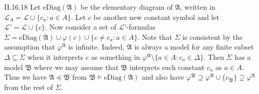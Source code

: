 \documentclass[12pt]{article}
\begin{document}
\begin{customthm}{II.16.18}
  Let $\mathrm{eDiag}(\mathfrak{A})$ be the elementary diagram of $\mathfrak{A}$, written in $\mathcal{L}_A=\mathcal{L}\cup\{c_a:a\in A\}$. Let $c$ be another new constant symbol and let $\mathcal{L}'=\mathcal{L}\cup\{c\}$. Now consider a set of $\mathcal{L}'$-formulas $\Sigma=\mathrm{eDiag}(\mathfrak{A})\cup{\varphi(c)}\cup\{c\neq c_a:a\in A\}$. Note that $\Sigma$ is consistent by the assumption that $\varphi^\mathfrak{A}$ is infinite. Indeed, $\mathfrak{A}$ is always a model for any finite subset $\Delta\subseteq\Sigma$ when it interprets $c$ as something in $\varphi^\mathfrak{A}\setminus\{a\in A: c_a\in\Delta\}$. Then $\Sigma$ has a model $\mathfrak{B}$ where we may assume that $\mathfrak{B}$ interprets each constant $c_a$ as $a\in A$. Thus we have $\mathfrak{A}\preccurlyeq\mathfrak{B}$ from $\mathfrak{B}\models\mathrm{eDiag}(\mathfrak{A})$ and also have $\varphi^\mathfrak{B}\supseteq\varphi^\mathfrak{A}\cup\{c_\mathfrak{B}\}\supsetneq\varphi^\mathfrak{A}$ from the rest of $\Sigma$.
\end{customthm}
\end{document}
